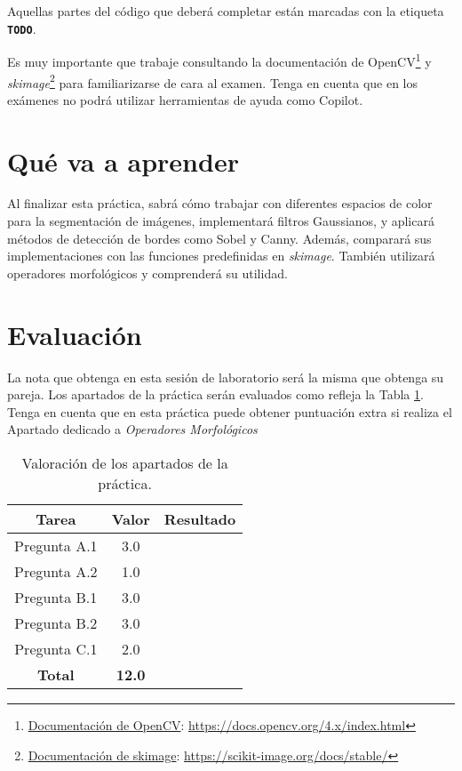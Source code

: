 Aquellas partes del código que deberá completar están marcadas con la etiqueta \textbf{\texttt{TODO}}.

Es muy importante que trabaje consultando la documentación de OpenCV\footnote{\href{https://docs.opencv.org/4.x/index.html}{Documentación de OpenCV}: \url{https://docs.opencv.org/4.x/index.html}} y \textit{skimage}\footnote{\href{https://scikit-image.org/docs/stable/}{Documentación de skimage}: \url{https://scikit-image.org/docs/stable/}} para familiarizarse de cara al examen. Tenga en cuenta que en los exámenes no podrá utilizar herramientas de ayuda como Copilot.

\section{Qué va a aprender}

Al finalizar esta práctica, sabrá cómo trabajar con diferentes espacios de color para la segmentación de imágenes, implementará filtros Gaussianos, y aplicará métodos de detección de bordes como Sobel y Canny. Además, comparará sus implementaciones con las funciones predefinidas en \textit{skimage}. También utilizará operadores morfológicos y comprenderá su utilidad.

\section{Evaluación}

La nota que obtenga en esta sesión de laboratorio será la misma que obtenga su pareja. Los apartados de la práctica serán evaluados como refleja la Tabla \ref{table:evaluacion}. Tenga en cuenta que en esta práctica puede obtener puntuación extra si realiza el Apartado dedicado a \textit{Operadores Morfológicos}

\begin{table}[h!]
    \centering
    \begin{tabular}{|c|c|c|}
    \hline
    \textbf{Tarea} & \textbf{Valor} & \textbf{Resultado} \\
    \hline
    Pregunta A.1 & 3.0 & \\
    \hline
    Pregunta A.2 & 1.0 & \\
    \hline
    Pregunta B.1 & 3.0 & \\
    \hline
    Pregunta B.2 & 3.0 & \\
    \hline
    Pregunta C.1 & 2.0 & \\
    \hline
    \textbf{Total} & \textbf{12.0} & \\
    \hline
    \end{tabular}
    \caption{Valoración de los apartados de la práctica.}
    \label{table:evaluacion}
\end{table}
